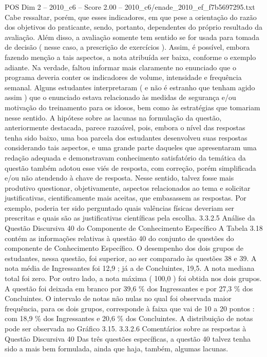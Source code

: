 \begin{textsample}{POS Dim 2 – 2010\_c6 – Score 2.00 – 2010\_c6/enade\_2010\_ef\_f7b5697295.txt}
Cabe ressaltar, porém, que esses indicadores, em que pese a orientação do razão dos objetivos do praticante, sendo, portanto, dependentes do próprio resultado da avaliação.
Além disso, a avaliação somente tem sentido se for usada para tomada de decisão ( nesse caso, a prescrição de exercícios ).
Assim, é possível, embora fazendo menção a tais aspectos, a nota atribuída ser baixa, conforme o exemplo adiante.
Na verdade, faltou informar mais claramente no enunciado que o programa deveria conter os indicadores de volume, intensidade e frequência semanal.
Alguns estudantes interpretaram ( e não é estranho que tenham agido assim ) que o enunciado estava relacionado às medidas de segurança e/ou motivação do treinamento para os idosos, bem como às estratégias que tomariam nesse sentido.
A hipótese sobre as lacunas na formulação da questão, anteriormente destacada, parece razoável, pois, embora o nível das respostas tenha sido baixo, uma boa parcela dos estudantes desenvolveu suas respostas considerando tais aspectos, e uma grande parte daqueles que apresentaram uma redação adequada e demonstravam conhecimento satisfatório da temática da questão também adotou esse viés de resposta, com correção, porém simplificada e/ou não atendendo à chave de resposta.
Nesse sentido, talvez fosse mais produtivo questionar, objetivamente, aspectos relacionados ao tema e solicitar justificativas, cientificamente mais aceitas, que embasassem as respostas.
Por exemplo, poderia ter sido perguntado quais valências físicas deveriam ser prescritas e quais são as justificativas científicas pela escolha. 3.3.2.5 Análise da Questão Discursiva 40 do Componente de Conhecimento Específico A Tabela 3.18 contém as informações relativas à questão 40 do conjunto de questões do componente de Conhecimento Específico.
O desempenho dos dois grupos de estudantes, nessa questão, foi superior, ao ser comparado às questões 38 e 39.
A nota média de Ingressantes foi 12,9 ; já a de Concluintes, 19,5.
A nota mediana total foi zero.
Por outro lado, a nota máxima ( 100,0 ) foi obtida nos dois grupos.
A questão foi deixada em branco por 39,6 \% dos Ingressantes e por 27,3 \% dos Concluintes.
O intervalo de notas não nulas no qual foi observada maior frequência, para os dois grupos, corresponde à faixa que vai de 10 a 20 pontos : com 18,9 \% dos Ingressantes e 20,6 \% dos Concluintes.
A distribuição de notas pode ser observada no Gráfico 3.15. 3.3.2.6 Comentários sobre as respostas à Questão Discursiva 40 Das três questões específicas, a questão 40 talvez tenha sido a mais bem formulada, ainda que haja, também, algumas lacunas.

\end{textsample}
